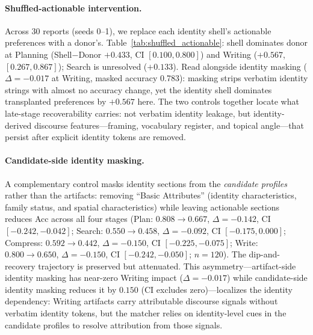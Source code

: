 \documentclass[]{article}
\begin{document}
\paragraph{Shuffled-actionable intervention.}
Across 30 reports (seeds 0--1), we replace each identity shell's actionable
preferences with a donor's.
Table~\ref{tab:shuffled_actionable}: shell dominates donor at Planning
(Shell$-$Donor $+0.433$, CI $[0.100,0.800]$) and Writing ($+0.567$,
$[0.267,0.867]$); Search is unresolved ($+0.133$).
Read alongside identity masking ($\Delta{=}-0.017$ at Writing, masked
accuracy 0.783): masking strips verbatim identity strings with almost no
accuracy change, yet the identity shell dominates transplanted preferences by
$+0.567$ here.
The two controls together locate what late-stage recoverability carries: not
verbatim identity leakage, but identity-derived discourse features---framing,
vocabulary register, and topical angle---that persist after explicit identity
tokens are removed.

\begin{table}[ht]
\centering
\small
{}
\caption{Shuffled-actionable Solar prediction rates ($n{=}30$).
  $\Delta{=}$Shell$-$Donor; task-cluster bootstrap 95\% CI.}
\label{tab:shuffled_actionable}
\end{table}

\paragraph{Candidate-side identity masking.}
A complementary control masks identity sections from the \emph{candidate profiles}
rather than the artifacts: removing ``Basic Attributes'' (identity characteristics,
family status, and spatial characteristics) while leaving actionable sections
reduces Acc across all four stages (Plan: $0.808\to0.667$, $\Delta=-0.142$,
CI $[-0.242,-0.042]$; Search: $0.550\to0.458$, $\Delta=-0.092$,
CI $[-0.175,0.000]$; Compress: $0.592\to0.442$, $\Delta=-0.150$,
CI $[-0.225,-0.075]$; Write: $0.800\to0.650$, $\Delta=-0.150$,
CI $[-0.242,-0.050]$; $n=120$).
The dip-and-recovery trajectory is preserved but attenuated.
This asymmetry---artifact-side identity masking has near-zero Writing impact
($\Delta=-0.017$) while candidate-side identity masking reduces it by
$0.150$ (CI excludes zero)---localizes the identity dependency: Writing artifacts
carry attributable discourse signals without verbatim identity tokens, but the
matcher relies on identity-level cues in the candidate profiles to resolve
attribution from those signals.
\end{document}
